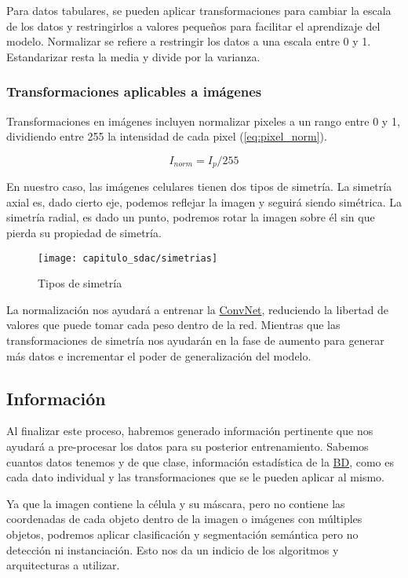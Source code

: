 Para datos tabulares, se pueden aplicar transformaciones para cambiar la escala
de los datos y restringirlos a valores pequeños para facilitar el aprendizaje
del modelo. Normalizar se refiere a restringir los datos a una escala entre 0 y
1. Estandarizar resta la media y divide por la varianza.

\subsubsection{Transformaciones aplicables a imágenes}

Transformaciones en imágenes incluyen normalizar pixeles a un rango entre 0 y 1, dividiendo
entre 255 la intensidad de cada pixel (\autoref{eq:pixel_norm}).

\begin{equation}
    \label{eq:pixel_norm}
    I_{norm} = I_{p} / 255
\end{equation}

En nuestro caso, las imágenes celulares tienen dos tipos de simetría. La
simetría axial es, dado cierto eje, podemos reflejar la imagen y seguirá siendo
simétrica. La simetría radial, es dado un punto, podremos rotar la imagen sobre
él sin que pierda su propiedad de simetría.

\begin{figure}[H]
    \centering
    \texttt{[image: capitulo\_sdac/simetrias]}
    \caption{Tipos de simetría}\label{fig:simetrias}
\end{figure}

La normalización nos ayudará a entrenar la \hyperlink{abbr}{ConvNet}, reduciendo la libertad de
valores que puede tomar cada peso dentro de la red. Mientras que las
transformaciones de simetría nos ayudarán en la fase de aumento para generar más
datos e incrementar el poder de generalización del modelo.

\subsection{Información}

Al finalizar este proceso, habremos generado información pertinente que nos
ayudará a pre-procesar los datos para su posterior entrenamiento. Sabemos
cuantos datos tenemos y de que clase, información estadística de la \hyperlink{abbr}{BD}, como
es cada dato individual y las transformaciones que se le pueden aplicar al mismo.

Ya que la imagen contiene la célula y su máscara, pero no contiene las
coordenadas de cada objeto dentro de la imagen o imágenes con múltiples objetos,
podremos aplicar clasificación y segmentación semántica pero no detección ni
instanciación. Esto nos da un indicio de los algoritmos y arquitecturas a utilizar.

